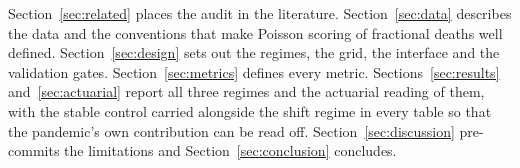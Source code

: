Section~\ref{sec:related} places the audit in the literature.
Section~\ref{sec:data} describes the data and the conventions that make
Poisson scoring of fractional deaths well defined. Section~\ref{sec:design}
sets out the regimes, the grid, the interface and the validation gates.
Section~\ref{sec:metrics} defines every metric. Sections~\ref{sec:results}
and~\ref{sec:actuarial} report all three regimes and the actuarial reading
of them, with the stable control carried alongside the shift regime in
every table so that the pandemic's own contribution can be read off.
Section~\ref{sec:discussion} pre-commits the limitations and
Section~\ref{sec:conclusion} concludes.
